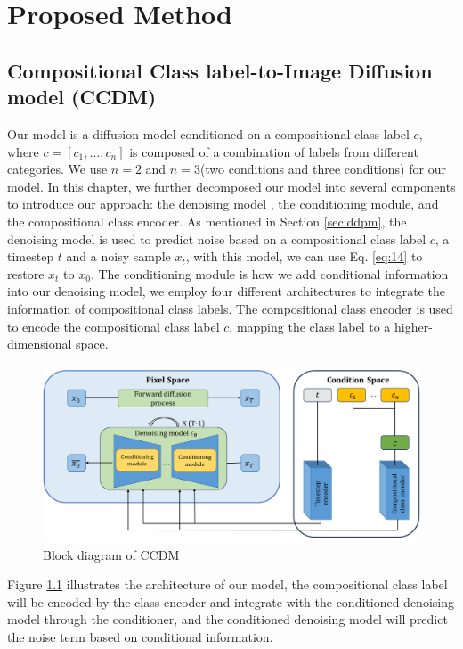 \chapter{Proposed Method}
\label{chapter:method}


\section{Compositional Class label-to-Image Diffusion model (CCDM)}
\label{sec:CCDM}
Our model is a diffusion model conditioned on a compositional class label $c$, where $c = [c_1, \dots, c_n]$ is composed of a combination of labels from different categories. We use $n = 2$ and $n = 3$(two conditions and three conditions) for our model. In this chapter, we further decomposed our model into several components to introduce our approach: the denoising model , the conditioning module, and the compositional class encoder. As mentioned in Section \ref{sec:ddpm}, the denoising model is used to predict noise based on a compositional class label $c$, a timestep $t$ and a noisy sample $x_t$, with this model, we can use Eq. \ref{eq:14} to restore $x_t$ to $x_0$. The conditioning module is how we add conditional information into our denoising model, we employ four different architectures to integrate the information of compositional class labels.
The compositional class encoder is used to encode the compositional class label $c$, mapping the class label to a higher-dimensional space.
\begin{figure} [H]
    \centering
    \includegraphics[width=0.8\linewidth]{figures/CCDMBlock.pdf}
    \caption{Block diagram of CCDM}
    \label{fig:CCDM}
\end{figure}
Figure \ref{fig:CCDM} illustrates the architecture of our model, the compositional class label will be encoded by the class encoder and integrate with the conditioned denoising model through the conditioner, and the conditioned denoising model will predict the noise term based on conditional information.

